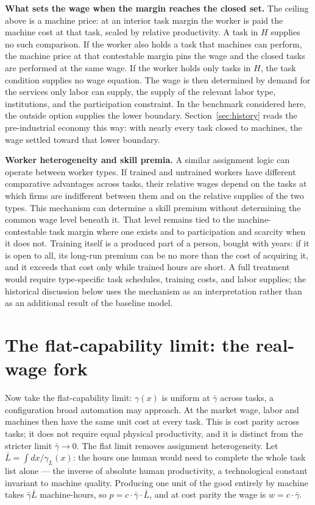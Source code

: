 \documentclass[12pt]{article}
\theoremstyle{plain}
\begin{document}
\textbf{What sets the wage when the margin reaches the closed set.}
The ceiling above is a machine price: at an interior task margin the worker
is paid the machine cost at that task, scaled by relative productivity. A
task in $H$ supplies no such comparison. If the worker also holds a task that
machines can perform, the machine price at that contestable margin pins the
wage and the closed tasks are performed at the same wage. If the worker holds
only tasks in $H$, the task condition supplies no wage equation. The wage is
then determined by demand for the services only labor can supply, the supply
of the relevant labor type, institutions, and the participation constraint.
In the benchmark considered here, the outside option supplies the lower
boundary. Section~\ref{sec:history} reads the pre-industrial economy this
way: with nearly every task closed to machines, the wage settled toward that
lower boundary.

\textbf{Worker heterogeneity and skill premia.}
A similar assignment logic can operate between worker types. If trained and
untrained workers have different comparative advantages across tasks, their
relative wages depend on the tasks at which firms are indifferent between
them and on the relative supplies of the two types. This mechanism can
determine a skill premium without determining the common wage level beneath
it. That level remains tied to the machine-contestable task margin where one
exists and to participation and scarcity when it does not. Training itself is
a produced part of a person, bought with years: if it is open to all, its
long-run premium can be no more than the cost of acquiring it, and it exceeds
that cost only while trained hours are short. A full treatment would require
type-specific task schedules, training costs, and labor supplies; the
historical discussion below uses the mechanism as an interpretation rather
than as an additional result of the baseline model.

\section{The flat-capability limit: the real-wage fork}\label{sec:limit}

Now take the flat-capability limit: $\gamma(x)$ is uniform at $\bar{\gamma}$ across tasks, a configuration broad automation may approach. At the market wage, labor and machines then have the same unit cost at every task. This is cost parity across tasks; it does not require equal physical productivity, and it is distinct from the stricter limit $\bar{\gamma}\to0$. The flat limit removes assignment heterogeneity. Let $\bar{L} = \int dx/\gamma _L(x)$: the hours one human would need to complete the whole task list alone --- the inverse of absolute human productivity, a technological constant invariant to machine quality. Producing one unit of the good entirely by machine takes $\bar{\gamma}\bar{L}$ machine-hours, so $p = c\cdot \bar{\gamma}\cdot \bar{L}$, and at cost parity the wage is $w = c\cdot \bar{\gamma}$.
\end{document}
